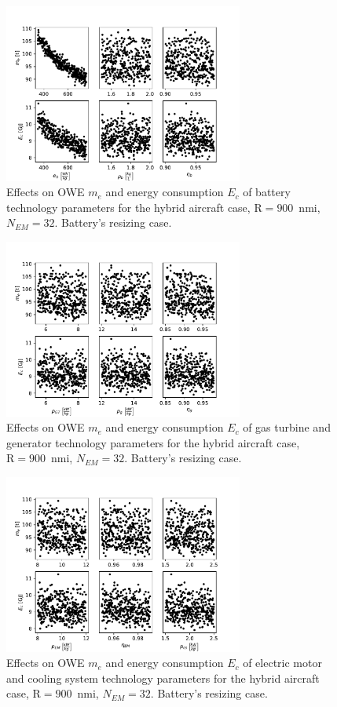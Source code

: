 \begin{figure}[h!]
	\centering
	\includegraphics[keepaspectratio, width=0.7\textwidth]{images/app_sens_plot/techno_optimization_battery}
	\caption{Effects on OWE $m_e$ and energy consumption $E_c$ of battery technology parameters for the hybrid aircraft case, $\textrm{R}=900$~nmi, $N_{EM}=32$. Battery's resizing case.}
	\label{fig:sens_opt_battery}
\end{figure}
\begin{figure}[h!]
	\centering
	\includegraphics[keepaspectratio, width=0.7\textwidth]{images/app_sens_plot/techno_optimization_gen}
	\caption{Effects on OWE $m_e$ and energy consumption $E_c$ of gas turbine and generator technology parameters for the hybrid aircraft case, $\textrm{R}=900$~nmi, $N_{EM}=32$. Battery's resizing case.}
	\label{fig:sens_opt_gen}
\end{figure}
\begin{figure}[h!]
	\centering
	\includegraphics[keepaspectratio, width=0.7\textwidth]{images/app_sens_plot/techno_optimization_em_cs}
	\caption{Effects on OWE $m_e$ and energy consumption $E_c$ of electric motor and cooling system technology parameters for the hybrid aircraft case, $\textrm{R}=900$~nmi, $N_{EM}=32$. Battery's resizing case.}
	\label{fig:sens_opt_em_cs}
\end{figure}
